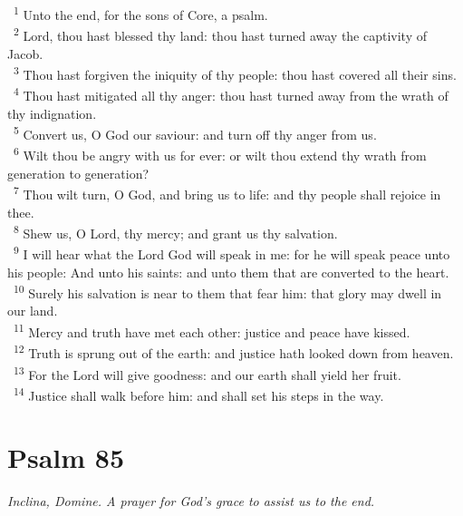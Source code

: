 \documentclass[a5paper,12pt]{article}
\begin{document}
\begin{multicols*}{2}
~\textsuperscript{1} Unto the end, for the sons of Core, a psalm.\\
~\textsuperscript{2} Lord, thou hast blessed thy land: thou hast turned away the captivity of Jacob.\\
~\textsuperscript{3} Thou hast forgiven the iniquity of thy people: thou hast covered all their sins.\\
~\textsuperscript{4} Thou hast mitigated all thy anger: thou hast turned away from the wrath of thy indignation.\\
~\textsuperscript{5} Convert us, O God our saviour: and turn off thy anger from us.\\
~\textsuperscript{6} Wilt thou be angry with us for ever: or wilt thou extend thy wrath from generation to generation?\\
~\textsuperscript{7} Thou wilt turn, O God, and bring us to life: and thy people shall rejoice in thee.\\
~\textsuperscript{8} Shew us, O Lord, thy mercy; and grant us thy salvation.\\
~\textsuperscript{9} I will hear what the Lord God will speak in me: for he will speak peace unto his people: And unto his saints: and unto them that are converted to the heart.\\
~\textsuperscript{10} Surely his salvation is near to them that fear him: that glory may dwell in our land.\\
~\textsuperscript{11} Mercy and truth have met each other: justice and peace have kissed.\\
~\textsuperscript{12} Truth is sprung out of the earth: and justice hath looked down from heaven.\\
~\textsuperscript{13} For the Lord will give goodness: and our earth shall yield her fruit.\\
~\textsuperscript{14} Justice shall walk before him: and shall set his steps in the way.\\

\section{Psalm 85}
\label{sec:orgde1244a}
\emph{Inclina, Domine. A prayer for God's grace to assist us to the end.}\\


\end{multicols*}
\end{document}
